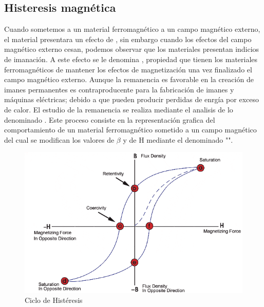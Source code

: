 \documentclass{report}
\begin{document}
  \subsection{Histeresis magnética}\label{ssec:histeresis}
Cuando sometemos a un material ferromagnético a un campo magnético externo, el material presentara
un efecto de , sin embargo cuando los efectos del campo magnético externo cesan,
podemos observar que los materiales presentan indicios de imanación.
\vspace{1em}\newline
A este efecto se le denomina , propiedad que tienen los materiales ferromagnéticos 
de mantener los efectos de magnetización una vez finalizado el campo magnético externo.\newline
Aunque la remanencia es favorable en la creación de imanes permanentes es contraproducente para la fabricación de imanes
y máquinas eléctricas; debido a que pueden producir perdidas de enrgía por exceso de calor.
\vspace{1em}
\newline
El estudio de la remanencia se realiza mediante el analisis de lo denominado . Este proceso
consiste en la representación grafica del comportamiento de un material ferromagnético sometido a un campo magnético del cual
se modifican los valores de $\beta$ y de $\mathrm{H}$ mediante el denominado "".
\begin{figure}[h]
  \vspace{1em}
  \centering 
  \includegraphics[width=1\linewidth]{hysteresis/hysteresis.png}
  \caption{Ciclo de Histéresis}
  \label{fig:hysteresis}

\end{figure}
\newpage
\end{document}
